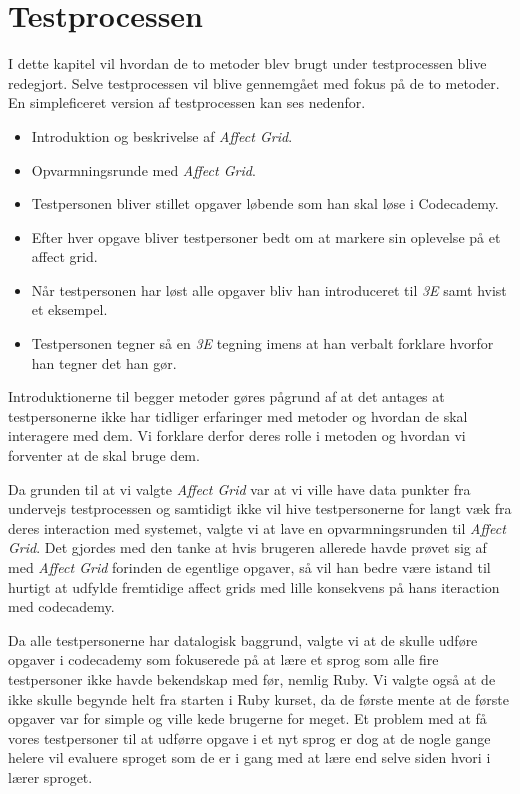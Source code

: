 \chapter{Testprocessen}\label{ch:evaproc}

I dette kapitel vil hvordan de to metoder blev brugt under testprocessen blive redegjort. Selve testprocessen vil blive gennemgået med fokus på de to metoder. En simpleficeret version af testprocessen kan ses nedenfor.

\begin{itemize}
\item Introduktion og beskrivelse af \textit{Affect Grid}.
\item Opvarmningsrunde med \textit{Affect Grid}.
\item Testpersonen bliver stillet opgaver løbende som han skal løse i Codecademy.
\item Efter hver opgave bliver testpersoner bedt om at markere sin oplevelse på et affect grid.
\item Når testpersonen har løst alle opgaver bliv han introduceret til \textit{3E} samt hvist et eksempel.
\item Testpersonen tegner så en \textit{3E} tegning imens at han verbalt forklare hvorfor han tegner det han gør.
\end{itemize}

Introduktionerne til begger metoder gøres pågrund af at det antages at testpersonerne ikke har tidliger erfaringer med metoder og hvordan de skal interagere med dem. Vi forklare derfor deres rolle i metoden og hvordan vi forventer at de skal bruge dem.

Da grunden til at vi valgte \textit{Affect Grid} var at vi ville have data punkter fra undervejs testprocessen og samtidigt ikke vil hive testpersonerne for langt væk fra deres interaction med systemet, valgte vi at lave en opvarmningsrunden til \textit{Affect Grid}. Det gjordes med den tanke at hvis brugeren allerede havde prøvet sig af med \textit{Affect Grid} forinden de egentlige opgaver, så vil han bedre være istand til hurtigt at udfylde fremtidige affect grids med lille konsekvens på hans iteraction med codecademy.

Da alle testpersonerne har datalogisk baggrund, valgte vi at de skulle udføre opgaver i codecademy som fokuserede på at lære et sprog som alle fire testpersoner ikke havde bekendskap med før, nemlig Ruby. Vi valgte også at de ikke skulle begynde helt fra starten i Ruby kurset, da de første mente at de første opgaver var for simple og ville kede brugerne for meget. Et problem med at få vores testpersoner til at udførre opgave i et nyt sprog er dog at de nogle gange helere vil evaluere sproget som de er i gang med at lære end selve siden hvori i lærer sproget.

